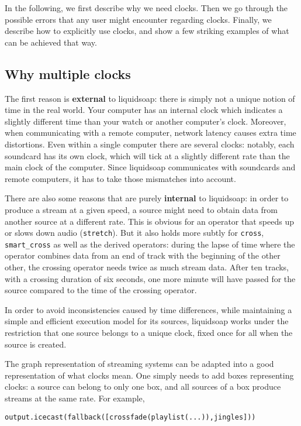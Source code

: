In the following, we first describe why we need clocks.
Then we go through the possible errors that any user might encounter
regarding clocks.
Finally, we describe how to explicitly use clocks,
and show a few striking examples of what can be achieved that way.

\subsection{Why multiple clocks}
The first reason is \textbf{external} to liquidsoap: there is simply
not a unique notion of time in the real world.
Your computer has an internal clock which indicates
a slightly different time than your watch or another computer's clock.
Moreover, when communicating with a remote computer, network
latency causes extra time distortions.
Even within a single computer there are several clocks: notably, each
soundcard has its own clock, which will tick at a slightly different
rate than the main clock of the computer.
Since liquidsoap communicates with soundcards and remote computers,
it has to take those mismatches into account.

There are also some reasons that are purely \textbf{internal} to liquidsoap:
in order to produce a stream at a given speed,
a source might need to obtain data from another source at
a different rate. This is obvious for an operator that speeds up or
slows down audio (\verb+stretch+). But it also holds more subtly
for \verb+cross+, \verb+smart_cross+ as well as the
derived operators: during the lapse of time where the operator combines
data from an end of track with the beginning of the other other,
the crossing operator needs twice as much stream data. After ten tracks,
with a crossing duration of six seconds, one more minute will have
passed for the source compared to the time of the crossing operator.

In order to avoid inconsistencies caused by time differences,
while maintaining a simple and efficient execution model for
its sources, liquidsoap works under the restriction that
one source belongs to a unique clock,
fixed once for all when the source is created.

The graph representation of streaming systems can be adapted
into a good representation of what clocks mean.
One simply needs to add boxes representing clocks:
a source can belong to only one box,
and all sources of a box produce streams at the same rate.
For example, 
\begin{verbatim}
output.icecast(fallback([crossfade(playlist(...)),jingles]))
\end{verbatim}

